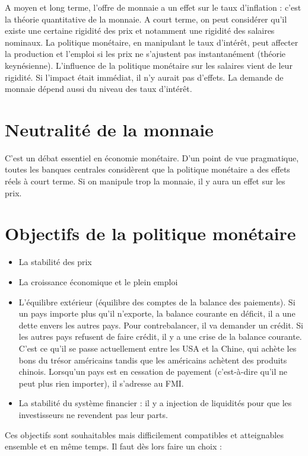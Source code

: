 	A moyen et long terme, l'offre de monnaie a un effet sur le taux d'inflation : c'est la théorie quantitative de la monnaie.	A court terme, on peut considérer qu'il existe une certaine rigidité des prix et notamment une rigidité des salaires nominaux. La politique monétaire, en manipulant le taux d'intérêt, peut affecter la production et l'emploi si les prix ne s'ajustent pas instantanément (théorie keynésienne). L'influence de la politique monétaire sur les salaires vient de leur rigidité. Si l'impact était immédiat, il n'y aurait pas d'effets.	La demande de monnaie dépend aussi du niveau des taux d'intérêt.
	
\section{Neutralité de la monnaie}

C'est un débat essentiel en économie monétaire. D'un point de vue pragmatique, toutes les banques centrales considèrent que la politique monétaire a des effets réels à court terme. Si on manipule trop la monnaie, il y aura un effet sur les prix.

\section{Objectifs de la politique monétaire}

\begin{itemize}
	\item La stabilité des prix
	\item La croissance économique et le plein emploi
	\item L'équilibre extérieur (équilibre des comptes de la balance des paiements). Si un pays importe plus qu'il n'exporte, la balance courante en déficit, il a une dette envers les autres pays. Pour contrebalancer, il va demander un crédit. Si les autres pays refusent de faire crédit, il y a une crise de la balance courante. C'est ce qu'il se passe actuellement entre les USA et la Chine, qui achète les bons du trésor américains tandis que les américains achètent des produits chinois. Lorsqu'un pays est en cessation de payement (c'est-à-dire qu'il ne peut plus rien importer), il s'adresse au FMI.
	\item La stabilité du système financier : il y a injection de liquidités pour que les investisseurs ne revendent pas leur parts.
\end{itemize}

Ces objectifs sont souhaitables mais difficilement compatibles et atteignables ensemble et en même temps. Il faut dès lors faire un choix :

